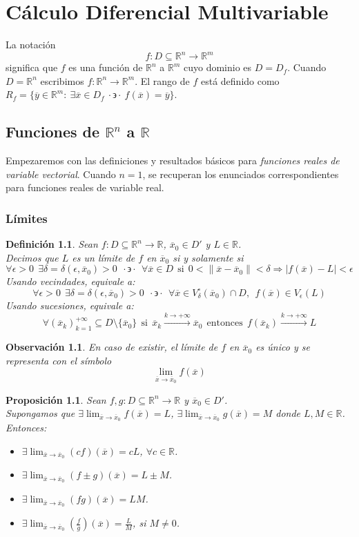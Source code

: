 \documentclass[11pt]{report}
\newtheorem{definition}{Definición}[section]
\newtheorem{observation}{Observación}[section]
\newtheorem{proposition}{Proposición}[section]
\newcommand{\Rn}{\mathbb{R}^{n}}
\newcommand{\Rm}{\mathbb{R}^{m}}
\newcommand{\R}{\mathbb{R}}
\newcommand{\x}{\overline{x}}
\newcommand{\xz}{\overline{x}_{0}}
\newcommand{\y}{\overline{y}}
\newcommand{\tq}{\cdot\backepsilon\cdot}
\begin{document}
\chapter{Cálculo Diferencial Multivariable}
La notación
$$f:D\subseteq\Rn\rightarrow\Rm$$
significa que $f$ es una función de $\Rn$ a $\Rm$ cuyo dominio es $D=D_{f}$. Cuando $D=\Rn$ escribimos $f:\Rn\rightarrow\Rm$. El rango de $f$ está definido como $R_{f}=\{\y\in\Rm:\ \exists\x\in D_{f}\ \tq\ f(\x)=\y\}$.
\section{Funciones de $\Rn$ a $\R$}
Empezaremos con las definiciones y resultados básicos para \emph{funciones reales de variable vectorial}. Cuando $n=1$, se recuperan los enunciados correspondientes para funciones reales de variable real.

\subsection{Límites}

\begin{definition} Sean $f:D\subseteq\Rn\rightarrow\R$, $\xz\in D'$ y $L\in\R$.\\
Decimos que $L$ es un límite de $f$ en $\xz$ si y solamente si
$$\forall\epsilon>0\ \ \exists\delta=\delta(\epsilon, \xz)>0\ \ \tq\ \ \forall\x\in D\ \ \text{si}\ \ 0<\| \x-\xz \|<\delta\Rightarrow|f(\x)-L|<\epsilon$$
Usando vecindades, equivale a:
$$\forall\epsilon>0\ \ \exists\delta=\delta(\epsilon, \xz)>0\ \ \tq\ \ \forall\x\in V_{\delta}^{\circ}(\xz)\cap D,\ \ f(\x)\in V_{\epsilon}(L)$$
Usando sucesiones, equivale a:
$$\forall(\x_{k})_{k=1}^{+\infty}\subseteq D\setminus\{\xz\}\ \ \text{si}\ \ \x_{k}\xrightarrow{k\rightarrow+\infty}\xz\ \ \text{entonces}\ \ f(\x_{k})\xrightarrow{k\rightarrow+\infty}L$$
\end{definition}

\begin{observation}
En caso de existir, el límite de $f$ en $\xz$ es único y se representa con el símbolo
$$\lim_{\x\to\xz}f(\x)$$
\end{observation}

\begin{proposition}
Sean $f, g:D\subseteq\Rn\rightarrow\R$ y $\xz\in D'$.\\
Supongamos que $\exists\lim_{\x\to\xz}f(\x)=L$, $\exists\lim_{\x\to\xz}g(\x)=M$ donde $L, M\in\R$. Entonces:
\begin{itemize}
\item[(i)] $\exists\lim_{\x\to\xz}(cf)(\x)=cL$, $\forall c\in\R$.
\item[(ii)] $\exists\lim_{\x\to\xz}(f\pm g)(\x)=L\pm M$.
\item[(iii)] $\exists\lim_{\x\to\xz}(fg)(\x)=LM$.
\item[(iv)] $\exists\lim_{\x\to\xz}\left(\frac{f}{g}\right)(\x)=\frac{L}{M}$, si $M\ne0$.
\end{itemize}
\end{proposition}
\end{document}
